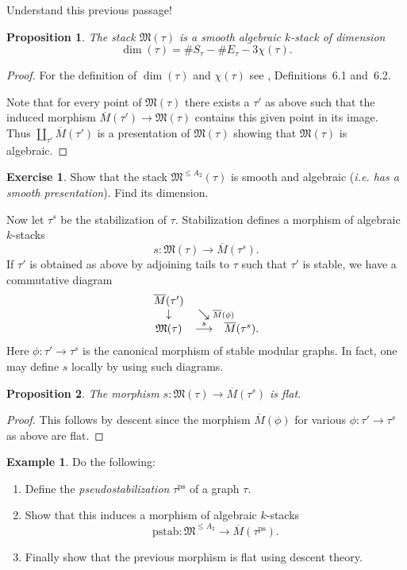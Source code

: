 \documentclass[11pt]{article}
\newcommand{\MM}{\mathfrak{M}}
\newcommand{\inversecomtri}[6]{
\begin{array}{ccc}
#1           &                                &            \\
\ldiag{#2}   & \sediagr{#3}                   &            \\
#4           & \stackrel{#5}{\longrightarrow} & #6
\end{array}}
\newcommand{\ldiag}[1]{\makebox[0cm]{\({\scriptstyle#1}\downarrow\phantom{\scriptstyle#1}\)}}
\newcommand{\ol}{\overline}
\newcommand{\sediagr}[1]{\makebox[0cm]{\(\phantom{\scriptstyle#1}\searrow{\scriptstyle#1}\)}}
\theoremstyle{plain}
\newtheorem{prop}{Proposition}
\theoremstyle{remark}
\newenvironment{pf}{\begin{proof}}{\end{proof}}
\newcommand{\ps}{\mathrm{ps}}
\theoremstyle{plain}
\theoremstyle{definition}
\newtheorem{Ex}[Th]{Example}
\newtheorem{Ej}[Th]{Exercise}
\theoremstyle{remark}
\newcounter{passage}
\begin{document}
\begin{ptcb}
  Understand this previous passage!
\end{ptcb}

\begin{prop}  The stack \(\MM(\tau)\) is a smooth algebraic \(k\)-stack of
dimension
\[
\dim(\tau)=\#S_{\tau}-\#E_{\tau}-3\chi(\tau).
\]
\end{prop}
\begin{pf} For the definition of \(\dim(\tau)\) and \(\chi(\tau)\) see \cite{BM},
Definitions~6.1 and~6.2.

Note that for every point of \(\MM(\tau)\) there exists a \(\tau'\) as
above such that the induced morphism \(\ol{M}(\tau')\to\MM(\tau)\)
contains this given point in its image. Thus
\(\coprod_{\tau'}\ol{M}(\tau')\) is a presentation of \(\MM(\tau)\)
showing that \(\MM(\tau)\) is algebraic.
\end{pf}

\begin{ptcb}
  \begin{Ej}
    Show that the stack \(\MM^{\leq A_2}(\tau)\) is smooth and algebraic (\emph{i.e. has a smooth presentation}). Find its dimension.
  \end{Ej}
\end{ptcb}
Now let \(\tau^s\) be the stabilization of \(\tau\). Stabilization defines
a morphism of algebraic \(k\)-stacks
\[
s:\MM(\tau)\longrightarrow\ol{M}(\tau^s).
\]
If \(\tau'\) is obtained as above by adjoining tails to \(\tau\) such that
\(\tau'\) is stable, we have a commutative diagram
\[
\inversecomtri{\ol{M}(\tau')}{
}{\ol{M}(\phi)}{\MM(\tau)}{s}{\ol{M}(\tau^s).}
\]
Here \(\phi:\tau'\to\tau^s\) is the canonical morphism of stable modular
graphs. In fact, one may define \(s\) locally by using such diagrams.
\begin{prop}
The morphism \(s:\MM(\tau)\rightarrow \ol{M}(\tau^s)\) is flat.
\end{prop}
\begin{pf}
This follows by descent since the morphism \(\ol{M}(\phi)\) for various
\(\phi:\tau'\rightarrow \tau^s\) as above are flat.
\end{pf}

\begin{ptcb}
  \begin{Ex}
    Do the following:
    \begin{enumerate}
      \item Define the \emph{pseudostabilization} \(\tau^{\ps}\) of a graph \(\tau\). 
      \item Show that this induces a morphism of algebraic \(k\)-stacks
      \[
        \text{pstab}:\MM^{\leq A_2}\to\ol{M}(\tau^{\ps}).
      \]
      \item Finally show that the previous morphism is flat using descent theory.
    \end{enumerate}
  \end{Ex}
\end{ptcb}
\end{document}

